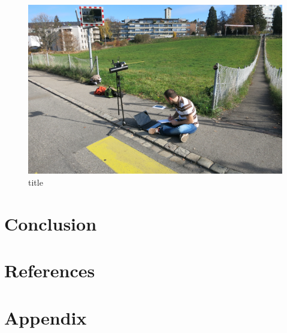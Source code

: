 \documentclass[12pt,a4paper]{article}
\begin{document}
		\begin{figure}
			\includegraphics[width=\textwidth]{images/cool.png}
			\caption{title}
			\label{cool}
		\end{figure}

\section{Conclusion}
	

\section{References}




\section{Appendix}
\pagestyle{empty}



\end{document}
